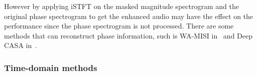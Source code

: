 However by applying iSTFT on the masked magnitude spectrogram and the original phase spectrogram to get the enhanced audio may have the effect on the performance since the phase spectrogram is not processed.
There are some methods that can reconstruct phase information, such is WA-MISI in~\cite{WA-MISI} and Deep CASA in~\cite{Deep_CASA}.

\subsubsection{Time-domain methods}
